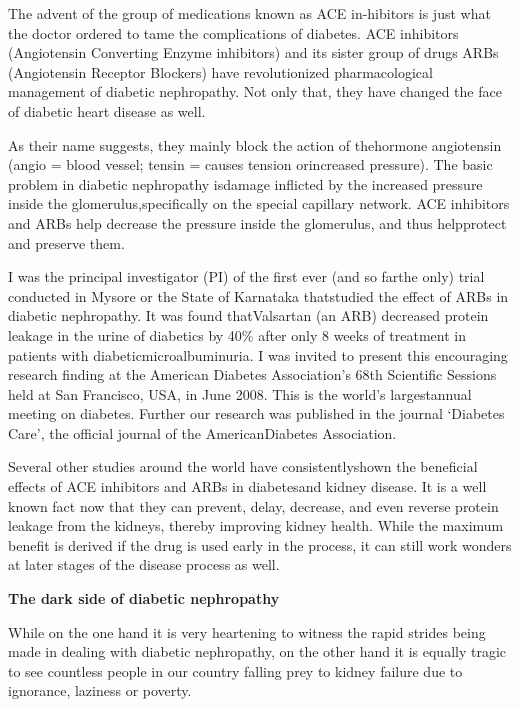 The advent of the group of medications known as ACE in-\break hibitors is just what the doctor ordered to tame the complications of diabetes. ACE inhibitors (Angiotensin Converting Enzyme inhibitors) and its sister group of drugs ARBs (Angiotensin Receptor Blockers) have revolutionized pharmacological management of diabetic nephropathy. Not only that, they have changed the face of diabetic heart disease as well.

As their name suggests, they mainly block the action of the\break hormone angiotensin (angio = blood vessel; tensin = causes tension or\break increased pressure). The basic problem in diabetic nephropathy is\break damage inflicted by the increased pressure inside the glomerulus,\break specifically on the special capillary network. ACE inhibitors and ARBs help decrease the pressure inside the glomerulus, and thus help\break protect and preserve them.

I was the principal investigator (PI) of the first ever (and so far\break the only) trial conducted in Mysore or the State of Karnataka that\break studied the effect of ARBs in diabetic nephropathy. It was found that\break Valsartan (an ARB) decreased protein leakage in the urine of dia\-betics by 40\% after only 8 weeks of treatment in patients with diabetic\break microalbuminuria. I was invited to present this encouraging research finding at the American Diabetes Association’s 68th Scientific Sessions held at San Francisco, USA, in June 2008. This is the world’s largest\break annual meeting on diabetes. Further our research was published in the journal ‘Diabetes Care’, the official journal of the American\break Diabetes Association.

\vskip 2pt

Several other studies around the world have consistently\break shown the beneficial effects of ACE inhibitors and ARBs in dia\-be\-tes\break and kidney disease. It is a well known fact now that they can prevent, delay, decrease, and even reverse protein leakage from the kidneys, thereby improving kidney health. While the maximum benefit is derived if the drug is used early in the process, it can still work wonders at later stages of the disease process as well.

\vskip 4pt
\noindent\textbf{The dark side of diabetic nephropathy}
\vskip 4pt

While on the one hand it is very heartening to witness the rapid strides being made in dealing with diabetic nephropathy, on the other hand it is equally tragic to see countless people in our country falling prey to kidney failure due to ignorance, laziness or poverty.

